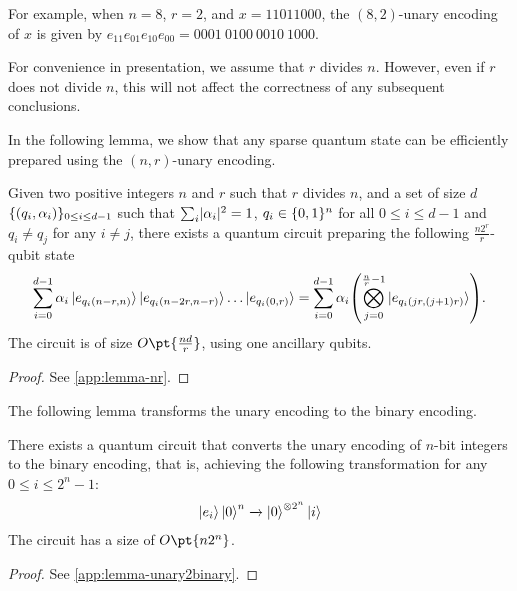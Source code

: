 \documentclass[a4paper,UKenglish,cleveref, autoref, thm-restate]{lipics-v2021}
\DeclarePairedDelimiter\rbra{\lparen}{\rparen}
\DeclarePairedDelimiter\cbra{\{}{\}}
\DeclarePairedDelimiter\abs{\lvert}{\rvert}
\newcommand{\bo}{O\pt}
\begin{document}
For example, when $n = 8$, $r = 2$, and $x = 11011000$, the $(8, 2)$-unary encoding of $x$ is given by $e_{11}e_{01}e_{10}e_{00} = 0001\ 0100\ 0010\ 1000$.

\begin{remark}
    For convenience in presentation, we assume that $ r $ divides $ n $. However, even if $ r $ does not divide $ n $, this will not affect the correctness of any subsequent conclusions.
\end{remark}

In the following lemma, we show that any sparse quantum state can be efficiently prepared using the $(n, r)$-unary encoding.

\begin{lemma}
    Given two positive integers $n$ and $r$ such that $r$ divides $n$, and a set of size $d$ $\cbra{(q_i, \alpha_i)}_{0 \leq i \leq d-1}$ such that $\sum_i \abs{\alpha_i}^2 = 1$, $q_i \in \cbra{0, 1}^n$ for all $0 \leq i \leq d-1$ and $q_i \neq q_j$ for any $i \neq j$, there exists a quantum circuit preparing the following $\frac{n2^r}{r}$-qubit state
    \begin{align}
        \sum_{i=0}^{d-1} \alpha_i \ket{e_{q_i(n-r, n)}} \ket{e_{q_i(n-2r, n-r)}} \dots \ket{e_{q_i(0, r)}}
        = \sum_{i=0}^{d-1} \alpha_i \rbra*{\bigotimes_{j=0}^{\frac{n}{r}-1} \ket{e_{q_i(jr, (j+1)r)}}}.
    \end{align}
    The circuit is of size $\bo{\frac{nd}{r}}$, using one ancillary qubits.
\end{lemma}
\begin{proof}
    See \cref{app:lemma-nr}.
\end{proof}


The following lemma transforms the unary encoding to the binary encoding. 

\begin{lemma}\label{lemma:unary2binary}
    There exists a quantum circuit that converts the unary encoding of $n$-bit integers to the binary encoding, that is, achieving the following transformation for any $0 \leq i \leq 2^n-1$:
    \begin{align}
        \ket{e_i}\ket{0}^n \xrightarrow{} \ket{0}^{\otimes 2^n} \ket{i}
    \end{align}
    The circuit has a size of $\bo{n2^n}$.
\end{lemma}
\begin{proof}
    See \cref{app:lemma-unary2binary}.
\end{proof}
\end{document}
